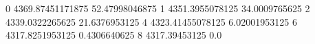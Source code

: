 0 4369.87451171875 52.47998046875
1 4351.3955078125 34.0009765625
2 4339.0322265625 21.6376953125
4 4323.41455078125 6.02001953125
6 4317.8251953125 0.4306640625
8 4317.39453125 0.0
